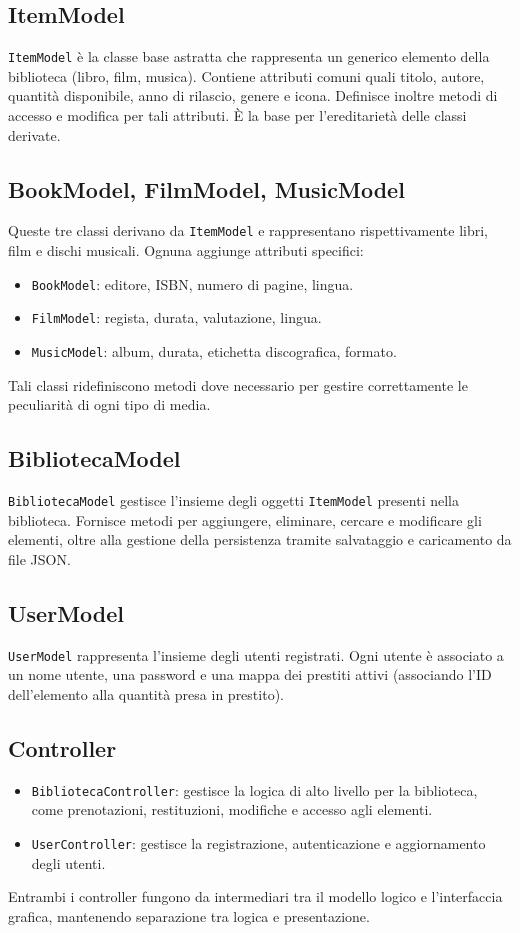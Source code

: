 \documentclass[a4paper,10pt]{article}
\begin{document}
\subsection{ItemModel}
\texttt{ItemModel} \`e la classe base astratta che rappresenta un generico elemento della biblioteca (libro, film, musica). Contiene attributi comuni quali titolo, autore, quantit\`a disponibile, anno di rilascio, genere e icona. Definisce inoltre metodi di accesso e modifica per tali attributi. \`E la base per l'ereditariet\`a delle classi derivate.

\subsection{BookModel, FilmModel, MusicModel}
Queste tre classi derivano da \texttt{ItemModel} e rappresentano rispettivamente libri, film e dischi musicali. Ognuna aggiunge attributi specifici:
\begin{itemize}
    \item \texttt{BookModel}: editore, ISBN, numero di pagine, lingua.
    \item \texttt{FilmModel}: regista, durata, valutazione, lingua.
    \item \texttt{MusicModel}: album, durata, etichetta discografica, formato.
\end{itemize}
Tali classi ridefiniscono metodi dove necessario per gestire correttamente le peculiarit\`a di ogni tipo di media.

\subsection{BibliotecaModel}
\texttt{BibliotecaModel} gestisce l'insieme degli oggetti \texttt{ItemModel} presenti nella biblioteca. Fornisce metodi per aggiungere, eliminare, cercare e modificare gli elementi, oltre alla gestione della persistenza tramite salvataggio e caricamento da file JSON.

\subsection{UserModel}
\texttt{UserModel} rappresenta l'insieme degli utenti registrati. Ogni utente \`e associato a un nome utente, una password e una mappa dei prestiti attivi (associando l'ID dell'elemento alla quantit\`a presa in prestito).

\subsection{Controller}
\begin{itemize}
    \item \texttt{BibliotecaController}: gestisce la logica di alto livello per la biblioteca, come prenotazioni, restituzioni, modifiche e accesso agli elementi.
    \item \texttt{UserController}: gestisce la registrazione, autenticazione e aggiornamento degli utenti.
\end{itemize}
Entrambi i controller fungono da intermediari tra il modello logico e l'interfaccia grafica, mantenendo separazione tra logica e presentazione.
\end{document}
